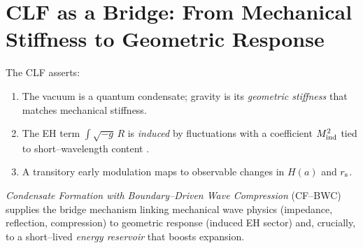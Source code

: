 \documentclass[11pt,a4paper]{article}
\newcommand{\rs}{r_{\rm s}}
\begin{document}
\section{CLF as a Bridge: From Mechanical Stiffness to Geometric Response}
The CLF asserts:
\begin{enumerate}
\item The vacuum is a quantum condensate; gravity is its \emph{geometric stiffness} that matches mechanical stiffness.
\item The EH term $\int \sqrt{-g}\,R$ is \emph{induced} by fluctuations with a coefficient $M_{\rm ind}^2$ tied to short--wavelength content \cite{Sakharov1967,Vassilevich2003}.
\item A transitory early modulation maps to observable changes in $H(a)$ and $\rs$.
\end{enumerate}
\emph{Condensate Formation with Boundary--Driven Wave Compression} (CF--BWC) supplies the bridge mechanism linking mechanical wave physics (impedance, reflection, compression) to geometric response (induced EH sector) and, crucially, to a short--lived \emph{energy reservoir} that boosts expansion.
\end{document}

